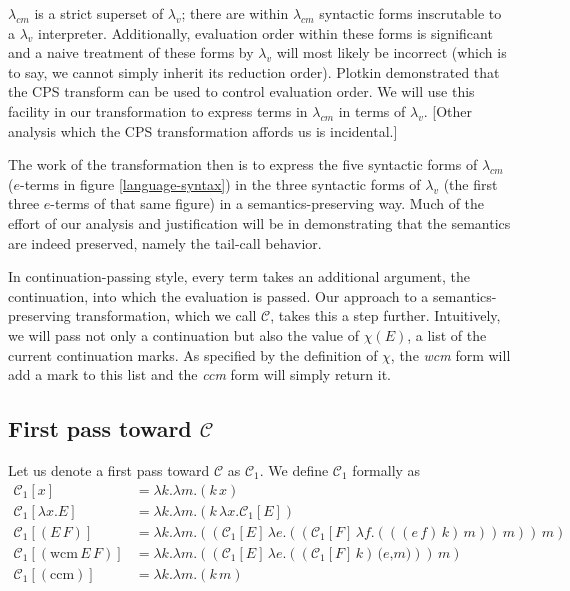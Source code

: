 \documentclass[ms,electronic,twosidetoc,letterpaper,chaptercenter,parttop]{byumsphd}
\begin{document}
$\lambda_{cm}$ is a strict superset of $\lambda_{v}$; there are within $\lambda_{cm}$
syntactic forms inscrutable to a $\lambda_{v}$ interpreter. Additionally, evaluation order
within these forms is significant and a naive treatment of these forms by $\lambda_{v}$
will most likely be incorrect (which is to say, we cannot simply inherit its reduction
order). Plotkin \cite{plotkin1975call} demonstrated that the CPS transform can be used to
control evaluation order. We will use this facility in our transformation to express terms
in $\lambda_{cm}$ in terms of $\lambda_{v}$. [Other analysis which the CPS transformation
affords us \cite{appel2007compiling} is incidental.]

The work of the transformation then is to express the five syntactic forms of
$\lambda_{cm}$ ($e$-terms in figure \ref{language-syntax}) in the three syntactic forms of
$\lambda_{v}$ (the first three $e$-terms of that same figure) in a semantics-preserving
way. Much of the effort of our analysis and justification will be in demonstrating that
the semantics are indeed preserved, namely the tail-call behavior.

In continuation-passing style, every term takes an additional argument, the continuation,
into which the evaluation is passed. Our approach to a semantics-preserving
transformation, which we call $\mathcal{C}$, takes this a step further. Intuitively, we
will pass not only a continuation but also the value of $\chi(E)$, a list of the current 
continuation marks. As specified by the definition of $\chi$, the \emph{wcm} form will 
add a mark to this list and the \emph{ccm} form will simply return it.

\subsection{First pass toward $\mathcal{C}$}

Let us denote a first pass toward $\mathcal{C}$ as $\mathcal{C}_{1}$. We define 
$\mathcal{C}_{1}$ formally as 
\begin{align*}
\mathcal{C}_{1}[x]                      &= \lambda k.\lambda m.(k\,x)\\
\mathcal{C}_{1}[\lambda x.E]            &= \lambda k.\lambda m.(k\,\lambda x.\mathcal{C}_{1}[E])\\
\mathcal{C}_{1}[(E\,F)]                 &= \lambda k.\lambda m.((\mathcal{C}_{1}[E]\,\lambda e.((\mathcal{C}_{1}[F]\,\lambda f.(((e\,f)\,k)\,m))\,m))\,m)\\
\mathcal{C}_{1}[(\mathrm{wcm}\,E\,F)]   &= \lambda k.\lambda m.((\mathcal{C}_{1}[E]\,\lambda e.((\mathcal{C}_{1}[F]\,k)\,\textbf{(}e\textbf{,}m\textbf{)}))\,m)\\
\mathcal{C}_{1}[(\mathrm{ccm})]         &= \lambda k.\lambda m.(k\,m)
\end{align*}
\end{document}

